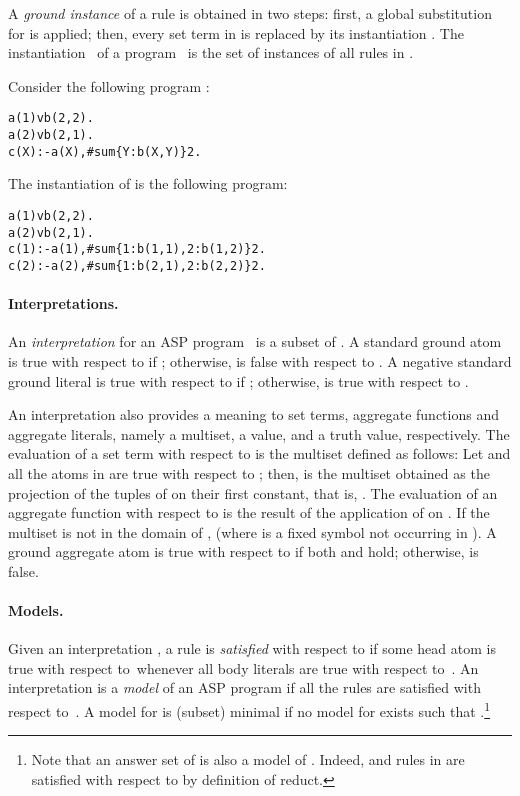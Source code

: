 \documentclass{tlp}
\begin{document}
A {\em ground instance} of a rule  is obtained in two steps:
first, a global substitution  for  is applied;
then, every set term  in  is replaced by its instantiation .
The instantiation \GP\ of a program \p\ is the set of instances of all rules in \p.

\begin{example}\label{ex:instantiation}
Consider the following program :
\begin{alltt}\small
 a(1) v b(2,2).
 a(2) v b(2,1).
 c(X) :- a(X), #sum\{Y: b(X,Y)\}  2.
\end{alltt}\normalsize
The instantiation  of  is the following program:
\begin{alltt}\small
 a(1) v b(2,2).
 a(2) v b(2,1).
 c(1) :- a(1), #sum\{1: b(1,1), 2: b(1,2)\}  2.
 c(2) :- a(2), #sum\{1: b(2,1), 2: b(2,2)\}  2. \punto
\end{alltt}\normalsize
\end{example}


\paragraph{Interpretations.}
An {\em interpretation}  for an ASP program \p\ is a subset of .
A standard ground atom  is true with respect to  if ;
otherwise,  is false with respect to .
A negative standard ground literal   is true with respect to  if ;
otherwise,   is true with respect to .

An interpretation  also provides a meaning to set terms, aggregate functions and aggregate literals, namely a multiset, a value, and a truth value, respectively.
The evaluation  of a set term  with respect to  is the multiset  defined as follows:
Let  and all the atoms in  are true with respect to ;
then,  is the multiset obtained as the projection of the tuples of  on their first constant, that is, .
The evaluation  of an aggregate function  with respect to  is the result of the application of  on .
If the multiset  is not in the domain of ,  (where  is a fixed symbol not occurring in \p).
A ground aggregate atom  is true with respect to  if both
 and
 hold;
otherwise,  is false.


\paragraph{Models.}
Given an interpretation , a rule  is {\em satisfied} with respect to  if some head atom is true with respect to\  whenever all body literals are true with respect to\ .
An interpretation  is a {\em model} of an ASP program  if all the rules  are satisfied with respect to\ .
A model  for  is (subset) minimal if no model  for  exists such that .\footnote{Note that an answer set  of  is also a model of .
Indeed,  and rules in  are satisfied with respect to  by definition of reduct.
}
\end{document}
